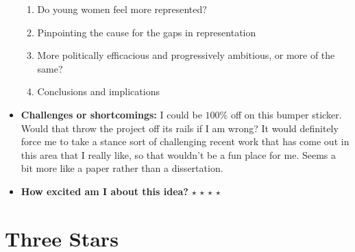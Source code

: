 \documentclass[12pt]{article}
\begin{document}
\begin{itemize}
\begin{enumerate}
            \item Do young women feel more represented?
            \item Pinpointing the cause for the gaps in representation
            \item More politically efficacious and progressively ambitious, or more of the same?
            \item Conclusions and implications
        \end{enumerate}
        \item \textbf{Challenges or shortcomings:} I could be $100\%$ off on this bumper sticker. Would that throw the project off its rails if I am wrong? It would definitely force me to take a stance sort of challenging recent work that has come out in this area that I really like, so that wouldn't be a fun place for me. Seems a bit more like a paper rather than a dissertation.
        \item \textbf{How excited am I about this idea?} $\star$ $\star$ $\star$ $\star$
    \end{itemize}

\section{Three Stars}
\end{document}
